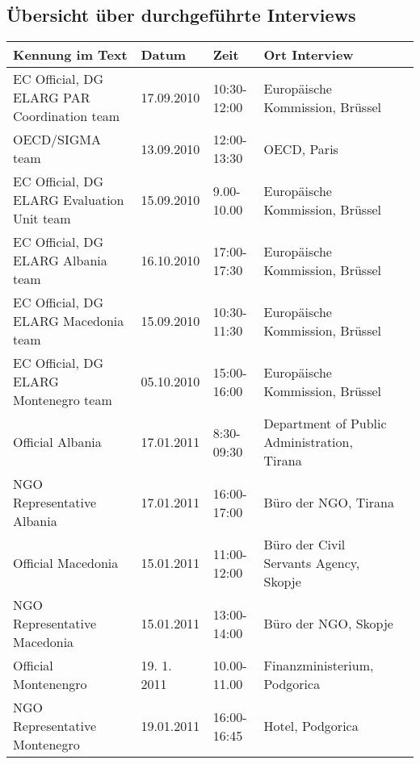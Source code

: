 \begin{landscape}
\renewcommand{\arraystretch}{1.5}
\chapter{Übersicht über durchgeführte Interviews}
\label{Übersicht über durchgeführte Interviews}	
\begin{table}[!hbt]\vspace{1ex}\centering		
\begin{tabular}{|l|l|l|l|l|}\hline
Kennung im Text&Datum&	Zeit&	Ort Interview\\\hline\hline
EC Official, DG ELARG PAR Coordination team&17.09.2010&10:30-12:00&Europäische Kommission, Brüssel\\
OECD/SIGMA team&13.09.2010&12:00-13:30&OECD, Paris\\
EC Official, DG ELARG Evaluation Unit team&	15.09.2010	&9.00-10.00&	Europäische Kommission, Brüssel\\
EC Official, DG ELARG Albania team&	16.10.2010	&17:00-17:30	&Europäische Kommission, Brüssel\\
EC Official, DG ELARG Macedonia team&	15.09.2010	&10:30-11:30&	Europäische Kommission, Brüssel\\
EC Official, DG ELARG Montenegro team&	05.10.2010&	15:00-16:00&	Europäische Kommission, Brüssel\\
Official Albania&	17.01.2011&	8:30-09:30	&Department of Public Administration, Tirana\\
NGO Representative Albania	&17.01.2011&	16:00-17:00	&Büro der NGO, Tirana\\
Official Macedonia	&15.01.2011&	11:00-12:00&	Büro der Civil Servants Agency, Skopje\\
NGO Representative Macedonia	&15.01.2011	&13:00-14:00	&Büro der NGO, Skopje\\
Official Montenengro	&19. 1. 2011&	10.00-11.00&	Finanzministerium, Podgorica\\
NGO Representative Montenegro	&19.01.2011&	16:00-16:45&	Hotel, Podgorica\\\hline
\end{tabular}
	\end{table}	
	\end{landscape}	

